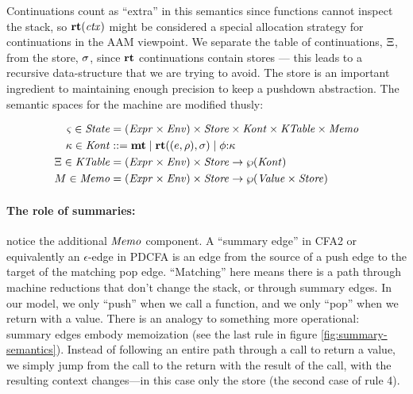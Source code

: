 Continuations count as ``extra'' in this semantics since functions cannot inspect the stack, so $\mathbf{rt}(\mathit{ctx})$ might be considered a special allocation strategy for continuations in the AAM viewpoint.
%
We separate the table of continuations, $\Xi$, from the store, $\sigma$, since $\mathbf{rt}$ continuations contain stores --- this leads to a recursive data-structure that we are trying to avoid.
%
The store is an important ingredient to maintaining enough precision to keep a pushdown abstraction.
%
The semantic spaces for the machine are modified thusly:

\begin{align*}
  \varsigma \in \mathit{State} &= (\mathit{Expr} \times \mathit{Env}) \times \mathit{Store} \times \mathit{Kont} \times \mathit{KTable} \times \mathit{Memo} \\
  \kappa \in \mathit{Kont} &::= \mathbf{mt} \mathrel{\mid} \mathbf{rt}((e,\rho),\sigma) \mathrel{\mid} \phi{\tt :} \kappa \\
  \Xi \in \mathit{KTable} &= (\mathit{Expr} \times \mathit{Env})\times \mathit{Store} \to \wp(\mathit{Kont}) \\
  M \in \mathit{Memo} &= (\mathit{Expr} \times \mathit{Env})\times \mathit{Store} \to \wp(\mathit{Value} \times \mathit{Store})
\end{align*}

\paragraph{The role of summaries:} notice the additional $\mathit{Memo}$ component.
%
A ``summary edge'' in CFA2 or equivalently an $\epsilon$-edge in PDCFA is an edge from the source of a push edge to the target of the matching pop edge.
%
``Matching'' here means there is a path through machine reductions that don't change the stack, or through summary edges.
%
In our model, we only ``push'' when we call a function, and we only ``pop'' when we return with a value.
%
There is an analogy to something more operational: summary edges embody memoization (see the last rule in figure \ref{fig:summary-semantics}).
%
Instead of following an entire path through a call to return a value, we simply jump from the call to the return with the result of the call, with the resulting context changes---in this case only the store (the second case of rule 4).

